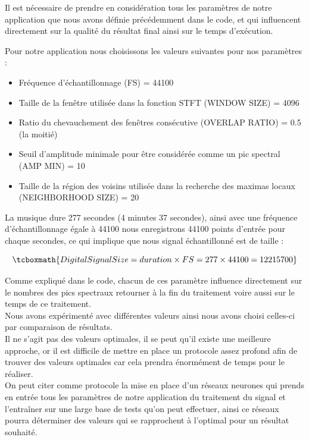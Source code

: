 \documentclass[11pt, report, french]{scrreprt}
\begin{document}
Il est nécessaire de prendre en considération tous les paramètres de notre application que nous avons définie précédemment dans le code, et qui influencent directement sur la qualité du résultat final ainsi sur le temps d'exécution.\\\par
Pour notre application nous choisissons les valeurs suivantes pour nos paramètres :\\

\begin{itemize}
	\item Fréquence d'échantillonnage (FS) = 44100
	\item Taille de la fenêtre utilisée dans la fonction STFT (WINDOW SIZE) = 4096
	\item Ratio du chevauchement des fenêtres consécutive (OVERLAP RATIO) = 0.5 (la moitié)
	\item Seuil d'amplitude minimale pour être considérée comme un pic spectral (AMP MIN) = 10
	\item Taille de la région des voisins utilisée dans la recherche des maximas locaux (NEIGHBORHOOD SIZE) = 20
\end{itemize}

\vspace{0.5cm}
La musique dure 277 secondes (4 minutes 37 secondes), ainsi avec une fréquence d'échantillonnage égale à 44100 nous enregistrons 44100 points d'entrée pour chaque secondes, ce qui implique que nous signal échantillonné est de taille :

\begin{equation}
\tcboxmath{ Digital Signal Size = duration \times FS =  277 \times 44100 = 12 215 700 }
\end{equation}

\vspace{0.5cm}
Comme expliqué dans le code, chacun de ces paramètre influence directement sur le nombres des pics spectraux retourner à la fin du traitement voire aussi sur le temps de ce traitement.\\
Nous avons expérimenté avec différentes valeurs ainsi nous avons choisi celles-ci par comparaison de résultats.\\
Il ne s'agit pas des valeurs optimales, il se peut qu'il existe une meilleure approche, or il est difficile de mettre en place un protocole assez profond afin de trouver des valeurs optimales car cela prendra énormément de temps pour le réaliser.\\
On peut citer comme protocole la mise en place d'un réseaux neurones qui prends en entrée tous les paramètres de notre application du traitement du signal et l'entraîner sur une large base de tests qu'on peut effectuer, ainsi ce réseaux pourra déterminer des valeurs qui se rapprochent à l'optimal pour un résultat souhaité.
\end{document}
